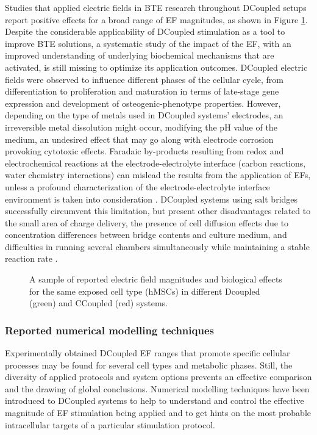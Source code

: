 Studies that applied electric fields in \ac{BTE} research throughout \ac{DCoupled} setups report positive effects for a broad range of \ac{EF} magnitudes, as shown in Figure \ref{fig: F2d1}. Despite the considerable applicability of \ac{DCoupled} stimulation as a tool to improve \ac{BTE} solutions, a systematic study of the impact of the \ac{EF}, with an improved understanding of underlying biochemical mechanisms that are activated, is still missing to optimize its application outcomes. \ac{DCoupled} electric fields were observed to influence different phases of the cellular cycle, from differentiation to proliferation and maturation in terms of late-stage gene expression and development of osteogenic-phenotype properties. However, depending on the type of metals used in \ac{DCoupled} systems' electrodes, an irreversible metal dissolution might occur, modifying the \ac{pH} value of the medium, an undesired effect that may go along with electrode corrosion provoking cytotoxic effects. Faradaic by-products resulting from redox and electrochemical reactions at the electrode-electrolyte interface (carbon reactions, water chemistry interactions) can mislead the results from the application of \ac{EF}s, unless a profound characterization of the electrode-electrolyte interface environment is taken into consideration \cite{Spadaro1982-af}. \ac{DCoupled} systems using salt bridges successfully circumvent this limitation, but present other disadvantages related to the small area of charge delivery, the presence of cell diffusion effects due to concentration differences between bridge contents and culture medium, and difficulties in running several chambers simultaneously while maintaining a stable reaction rate \cite{Guette-Marquet2021-rp}.


\begin{figure}
\caption{A sample of reported electric field magnitudes and biological effects for the same exposed cell type (hMSCs) in different Dcoupled (green) and CCoupled (red) systems.}
\label{fig: F2d1}
\end{figure}
      

\subsubsection{Reported numerical modelling techniques}
Experimentally obtained \ac{DCoupled} \ac{EF} ranges that promote specific cellular processes may be found for several cell types and metabolic phases. Still, the diversity of applied protocols and system options prevents an effective comparison and the drawing of global conclusions. Numerical modelling techniques have been introduced to \ac{DCoupled} systems to help to understand and control the effective magnitude of \ac{EF} stimulation being applied and to get hints on the most probable intracellular targets of a particular stimulation protocol. 

